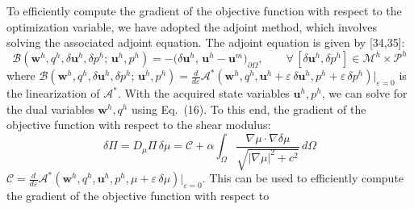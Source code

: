 \documentclass[11pt]{article}
\begin{document}
\noindent
To efficiently compute the gradient of the objective function with
respect to the optimization variable, we have adopted the adjoint
method, which involves solving the associated adjoint equation. The
adjoint equation is given by [34,35]:
\begin{equation}
\mathscr{B}\!\left(\mathbf{w}^h, q^h, \delta\mathbf{u}^h, \delta p^h
;\, \mathbf{u}^h, p^h\right)
= -\bigl(\delta\mathbf{u}^h,\,
         \mathbf{u}^h - \mathbf{u}^{m}\bigr)_{\partial\Omega},
\qquad
\forall\,[\delta\mathbf{u}^h, \delta p^h]
\in \mathscr{M}^h \times \mathscr{P}^h
\end{equation}
where
$\mathscr{B}(\mathbf{w}^h, q^h, \delta\mathbf{u}^h, \delta p^h;\,
\mathbf{u}^h, p^h) = \frac{d}{d\varepsilon}
\mathscr{A}^{*}\!(\mathbf{w}^h, q^h, \mathbf{u}^h
+ \varepsilon\,\delta\mathbf{u}^h, p^h
+ \varepsilon\,\delta p^h)\big|_{\varepsilon=0}$
is the linearization of $\mathscr{A}^{*}$. With the acquired state
variables $\mathbf{u}^h, p^h$, we can solve for the dual variables
$\mathbf{w}^h, q^h$ using Eq.~(16). To this end, the gradient of the
objective function with respect to the shear modulus:
\begin{equation}
\delta\Pi = D_{\mu}\Pi\,\delta\mu = \mathscr{C}
+ \alpha \int_{\Omega}
\dfrac{\nabla\mu \cdot \nabla\delta\mu}
      {\sqrt{|\nabla\mu|^{2} + c^{2}}}\, d\Omega
\end{equation}
$\mathscr{C} = \frac{d}{d\varepsilon}
\mathscr{A}^{*}\!(\mathbf{w}^h, q^h, \mathbf{u}^h, p^h,
\mu + \varepsilon\,\delta\mu)\big|_{\varepsilon=0}$.
This can be used to efficiently compute the gradient of the objective
function with respect to
\end{document}
